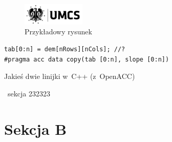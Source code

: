 \begin{figure}[b]
    \begin{center}
        \includegraphics[width=3cm]{LogoUMCS}
    \end{center}
    \caption{Przykładowy rysunek}\label{rys:przyk}
\end{figure}


\begin{lstfloat}[b]
    \lstset{language=C++}
    \begin{lstlisting}[frame=single]
tab[0:n] = dem[nRows][nCols]; //?
#pragma acc data copy(tab [0:n], slope [0:n])
\end{lstlisting}
    \caption{Jakieś dwie linijki w~C++ (z~OpenACC)}\label{lst:przyk}
\end{lstfloat}
\
sekcja 232323
\

\section{Sekcja B}


